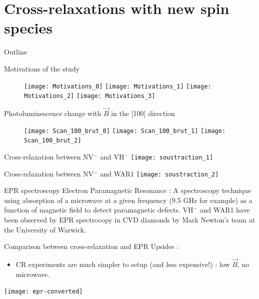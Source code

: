 \documentclass{beamer}
\begin{document}
\section{Cross-relaxations with new spin species}
\begin{frame}{Outline}
\tableofcontents[currentsection]
\end{frame}
\begin{frame}{Motivations of the study}
\begin{figure}
    \begin{overprint}
    \texttt{[image: Motivations\_0]}
    \texttt{[image: Motivations\_1]}
    \texttt{[image: Motivations\_2]}
    \texttt{[image: Motivations\_3]}
    \end{overprint}
\end{figure}
\end{frame}
\begin{frame}{Photoluminescence change with $\vec B$ in the [100] direction}
\begin{figure}
    \begin{overprint}
    \centering\texttt{[image: Scan\_100\_brut\_0]}
    \centering\texttt{[image: Scan\_100\_brut\_1]}
    \centering\texttt{[image: Scan\_100\_brut\_2]}
    \end{overprint}
\end{figure}
\end{frame}
\begin{frame}{Cross-relaxation between NV$^-$ and VH$^-$}
\texttt{[image: soustraction\_1]}
\end{frame}
\begin{frame}{Cross-relaxation between NV$^-$ and WAR1}
\texttt{[image: soustraction\_2]}
\end{frame}
\begin{frame}{EPR spectroscopy}
Electron Paramagnetic Resonance : A spectroscopy technique using absorption of a microwave at a given frequency (9.5 GHz for example) as a function of magnetic field to detect paramagnetic defects.
\bigbreak
VH$^-$ and WAR1  have been observed by EPR spectrocopy in CVD diamonds by Mark Newton's team at the University of Warwick.
\end{frame}
\begin{frame}{Comparison between cross-relaxation and EPR}
\pause
Upsides :
\begin{itemize}
\item CR experiments are much simpler to setup (and less expensive!) : low $\vec B$, no microwave.
\end{itemize}
\texttt{[image: epr-converted]}
\end{frame}
\end{document}
